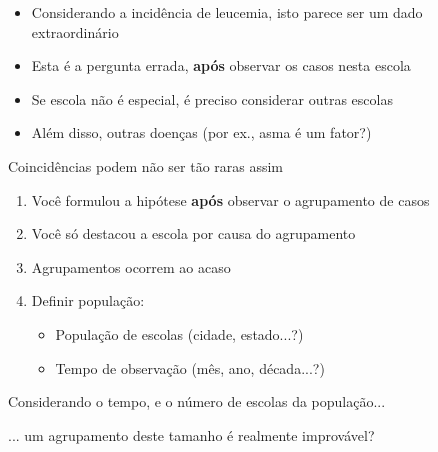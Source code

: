 \documentclass{beamer}
\begin{document}
\begin{frame}{\scriptsize }
  \begin{itemize}
    \footnotesize
  \item Considerando a incidência de leucemia, isto parece ser um dado extraordinário
    \bigskip
    \bigskip
  \item Esta é a pergunta errada, {\bf após} observar os casos nesta escola
  \item Se escola não é especial, é preciso considerar outras escolas
    \bigskip
    \bigskip
  \item Além disso, outras doenças (por ex., asma é um fator?)
  \end{itemize}
\end{frame}

\begin{frame}{\scriptsize Coincidências podem não ser tão raras assim}
  \begin{enumerate}
    \footnotesize
  \item Você formulou a hipótese {\bf após} observar o agrupamento de casos
    \bigskip
  \item Você só destacou a escola por causa do agrupamento
    \bigskip
  \item Agrupamentos ocorrem ao acaso
    \bigskip
  \item Definir população:
    \begin{itemize}
      \footnotesize
    \item População de escolas (cidade, estado...?)
    \item Tempo de observação (mês, ano, década...?)
    \end{itemize}
  \end{enumerate}
  \begin{block}{}
    \small
    Considerando o tempo, e o número de escolas da população...

    \bigskip
    ... um agrupamento deste tamanho é realmente improvável?
  \end{block}
\end{frame}
\end{document}
